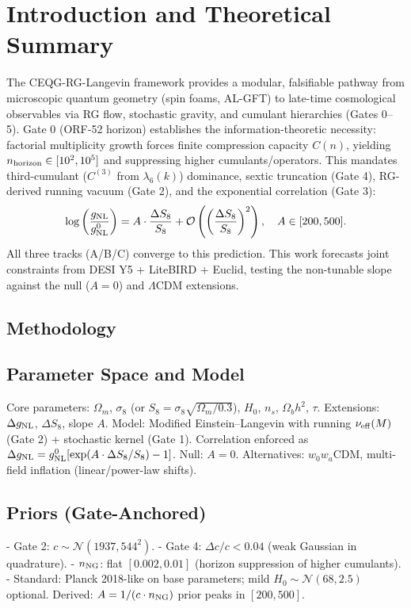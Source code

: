 \documentclass[12pt,a4paper]{article}
\begin{document}
\section{Introduction and Theoretical Summary}
The CEQG-RG-Langevin framework provides a modular, falsifiable pathway from microscopic quantum geometry (spin foams, AL-GFT) to late-time cosmological observables via RG flow, stochastic gravity, and cumulant hierarchies (Gates 0–5). Gate 0 (ORF-52 horizon) establishes the information-theoretic necessity: factorial multiplicity growth forces finite compression capacity $C(n)$, yielding $n_{\rm horizon} \in [10^2, 10^5]$ and suppressing higher cumulants/operators. This mandates third-cumulant ($C^{(3)}$ from $\lambda_6(k)$) dominance, sextic truncation (Gate 4), RG-derived running vacuum (Gate 2), and the exponential correlation (Gate 3):
\[
\log\left(\frac{g_{\rm NL}}{g_{\rm NL}^{0}}\right) = A \cdot \frac{\Delta S_8}{S_8} + \mathcal{O}\left(\left(\frac{\Delta S_8}{S_8}\right)^2\right), \quad A \in [200, 500].
\]
All three tracks (A/B/C) converge to this prediction. This work forecasts joint constraints from DESI Y5 + LiteBIRD + Euclid, testing the non-tunable slope against the null ($A=0$) and $\Lambda$CDM extensions.

\subsection{Methodology}

\subsection{Parameter Space and Model}
Core parameters: $\Omega_m$, $\sigma_8$ (or $S_8 = \sigma_8 \sqrt{\Omega_m/0.3}$), $H_0$, $n_s$, $\Omega_b h^2$, $\tau$.  
Extensions: $\Delta g_{\rm NL}$, $\Delta S_8$, slope $A$.  
Model: Modified Einstein–Langevin with running $\nu_{\rm eff}(M)$ (Gate 2) + stochastic kernel (Gate 1). Correlation enforced as $\Delta g_{\rm NL} = g_{\rm NL}^{0} [\exp(A \cdot \Delta S_8/S_8) - 1]$.  
Null: $A=0$. Alternatives: $w_0 w_a$CDM, multi-field inflation (linear/power-law shifts).

\subsection{Priors (Gate-Anchored)}
- Gate 2: $c \sim \mathcal{N}(1937, 544^2)$.  
- Gate 4: $\Delta c/c < 0.04$ (weak Gaussian in quadrature).  
- $n_{\rm NG}$: flat $[0.002, 0.01]$ (horizon suppression of higher cumulants).  
- Standard: Planck 2018-like on base parameters; mild $H_0 \sim \mathcal{N}(68, 2.5)$ optional.  
Derived: $A = 1/(c \cdot n_{\rm NG})$ prior peaks in $[200, 500]$.
\end{document}
